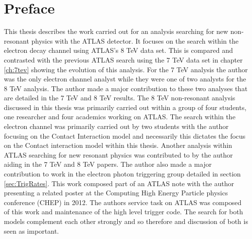 \chapter*{Preface}

This thesis describes the work carried out for an analysis searching for new non-resonant physics with the ATLAS detector. It focuses on the search within the electron decay channel using ATLAS's 8 TeV data set. This is compared and contrasted with the previous ATLAS search using the 7 TeV data set in chapter \ref{ch:7tev} showing the evolution of this analysis. For the 7 TeV analysis the author was the only electron channel analyst while they were one of two analysts for the 8 TeV analysis. The author made a major contribution to these two analyses that are detailed in the 7 TeV \cite{PhysRevD.87.015010} and 8 TeV \cite{ATLAS-CONF-2014-030} results.
The 8 TeV non-resonant analysis discussed in this thesis was primarily carried out within a group of four students, one researcher and four academics working on ATLAS. The search within the electron channel was primarily carried out by two students with the author focusing on the Contact Interaction model and necessarily this dictates the focus on the Contact interaction model within this thesis. 
Another analysis within ATLAS searching for new resonant physics was contributed to by the author aiding in the 7 TeV \cite{Aad:2012hf} and 8 TeV \cite{Z:1515998} papers. 
The author also made a major contribution to work in the electron photon triggering group detailed in section \ref{sec:TrigRates}. This work composed part of an ATLAS note \cite{ATL-PHYS-PUB-2011-007} with the author presenting a related poster \cite{Duguid:1450151} at the Computing High Energy Particle physics conference (CHEP) in 2012. 
The authors service task on ATLAS was composed of this work and maintenance of the high level trigger code.
The search for both models complement each other strongly and so therefore and discussion of both is seen as important. 






